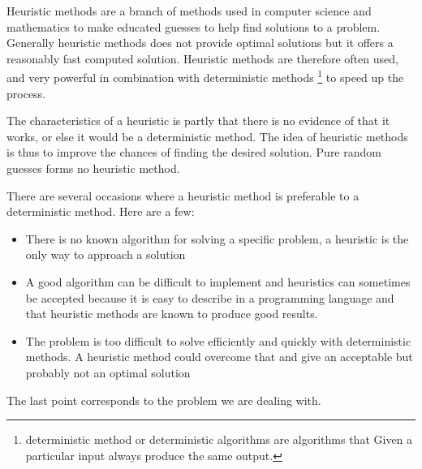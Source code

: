 Heuristic methods are a branch of methods used in computer science and mathematics to make educated guesses to help find solutions to a problem. Generally heuristic methods does not provide optimal solutions but it offers a reasonably fast computed solution. Heuristic methods are therefore often used, and very powerful in combination with deterministic methods \footnote{deterministic method  or deterministic algorithms are algorithms that Given a particular input always produce the same output.} to speed up the process.

The characteristics of a heuristic is partly that there is no evidence of that it works, or else it would be a deterministic method. The idea of heuristic methods is thus to improve the chances of finding the desired solution. Pure random guesses forms no heuristic method.

There are several occasions where a heuristic method is preferable to a deterministic method.
Here are a few:

\begin{itemize}
\item There is no known algorithm for solving a specific problem, a heuristic is the only way to approach a solution
\item A good algorithm can be difficult to implement and heuristics can sometimes be accepted because it is easy to describe in a programming language and that heuristic methods are known to produce good results.
\item The problem is too difficult to solve efficiently and quickly with deterministic methods. A heuristic method could overcome that and give an acceptable but probably not an optimal solution
\end{itemize}

The last point corresponds to the problem we are dealing with.